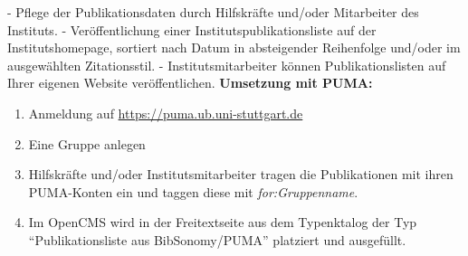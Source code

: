 - Pflege der Publikationsdaten durch Hilfskräfte und/oder Mitarbeiter des Instituts.\newline\newline
- Veröffentlichung einer Institutspublikationsliste auf der Institutshomepage, sortiert nach Datum in absteigender Reihenfolge und/oder im ausgewählten Zitationsstil.\newline\newline
- Institutsmitarbeiter können Publikationslisten auf Ihrer eigenen Website veröffentlichen.
\newline\newline
\textbf{Umsetzung mit PUMA:}
\begin{enumerate}
\item Anmeldung auf \url{https://puma.ub.uni-stuttgart.de} 
\item Eine Gruppe anlegen
\item Hilfskräfte und/oder Institutsmitarbeiter tragen die Publikationen mit ihren PUMA-Konten ein und taggen diese mit \textit{for:Gruppenname}.
\item Im OpenCMS wird in der Freitextseite aus dem Typenktalog der Typ \enquote{Publikationsliste aus BibSonomy/PUMA} platziert und ausgefüllt.
\end{enumerate}

